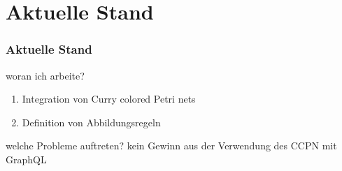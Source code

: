 

\section{Aktuelle Stand}

\begin{frame}{}
    \frametitle{Aktuelle Stand}

    \footnotesize

    \begin{alertblock}{woran ich arbeite?}
        \begin{enumerate}
            \item 
            Integration von  Curry colored Petri nets
            \item Definition von Abbildungsregeln 
        \end{enumerate}
    \end{alertblock}

    \begin{block}{welche Probleme auftreten?}
        kein Gewinn aus der Verwendung des CCPN mit GraphQL    
    \end{block}

\end{frame}